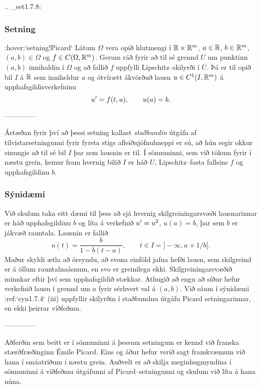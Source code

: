 .. _set1.7.8:

\subsubsection{Setning}{ :hover:`setning!Picard`}
Látum $\Omega$ vera opið hlutmengi í ${\mathbb R}\times {\mathbb R}\sp{m}$,
$a\in {\mathbb R}$, $b\in {\mathbb R}\sp m$,
$(a,b)\in \Omega$  og $f\in C(\Omega,{\mathbb R}\sp m)$. Gerum ráð fyrir að
til sé grennd $U$ um punktinn $(a,b)$ innihaldin í $\Omega$ og að
fallið $f$ uppfylli Lipschitz--skilyrði í $U$.  Þá
er til opið bil $I$ á ${\mathbb R}$ sem inniheldur $a$ og ótvírætt ákvörðuð lausn
$u\in C\sp 1(I, {\mathbb R}^m)$ á upphafsgildisverkefninu 
 $$u{\sp{\prime}}=f(t,u), \qquad u(a)=b.
 $$


--------------



Ástæðan fyrir því að þessi setning kallast {\it staðbundin}  útgáfa
af tilvistarsetningunni fyrir fyrsta stigs afleiðujöfnuhneppi er sú,
að hún segir okkur einungis að til sé bil $I$ þar sem lausnin er til.
Í sönnuninni, sem við tökum fyrir í næstu grein, 
kemur fram hvernig bilið $I$ er háð
$U$,  Lipschitz--fasta fallsins $f$ og upphafsgildinu $b$.  

\subsubsection{Sýnidæmi}  Við skulum taka eitt dæmi til þess að sjá hvernig 
skilgreiningarsvæði
lausnarinnar er háð upphafsgildinu $b$ og líta á verkefnið $u'=u\sp
2$, $u(a)=b$, þar sem $b$ er jákvæð rauntala.  Lausnin er fallið
 $$u(t)=\dfrac b{1-b(t-a)}, \qquad t\in I=]-\infty,a+1/b[.
 $$
Maður skyldi ætla að óreyndu, að svona einföld jafna hefði lausn, sem
skilgreind er á öllum rauntalnaásnum, en svo er greinilega ekki.
Skilgreiningarsvæðið minnkar eftir því sem upphafsgildið 
stækkar.   Athugið að engu að síður hefur verkefnið lausn í grennd
um $a$ fyrir sérhvert val á $(a,b)$.  Við sáum í sýnidæmi
:ref:`syn1.7.4` (iii) uppfyllir skilyrðin í staðbundnu útgáfu Picard
setningarinnar, en ekki þeirrar víðfeðmu.  


--------------



Aðferðin sem beitt er í sönnuninni á  þessum setningum er kennd
við franska stærðfræðinginn Émile Picard.  Eins og áður hefur verið
sagt framkvæmum við hana í smáatriðum í næstu grein.
Auðvelt er að skilja meginhugmyndina í sönnuninni á víðfeðmu útgáfunni
af Picard--setningunni og skulum við líta á hana núna.

